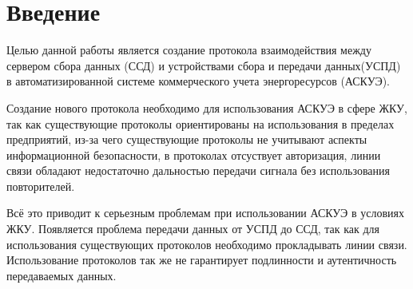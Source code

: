 \newpage
\section{Введение}
\setcounter{figure}{0}


Целью данной работы является создание протокола взаимодействия между сервером сбора данных (ССД) и устройствами сбора и передачи данных(УСПД) в автоматизированной системе коммерческого учета энергоресурсов (АСКУЭ).

Создание нового протокола необходимо для использования АСКУЭ в сфере ЖКУ, так как существующие протоколы ориентированы на использования в пределах предприятий, из-за чего существующие протоколы не учитывают аспекты информационной безопасности, в протоколах отсуствует авторизация, линии связи обладают недостаточно дальностью передачи сигнала без использования повторителей. 

Всё это приводит к серьезным проблемам при использовании АСКУЭ в условиях ЖКУ. Появляется проблема передачи данных от УСПД до ССД, так как для использования существующих протоколов необходимо прокладывать линии связи. Использование протоколов так же не гарантирует подлинности и аутентичность передаваемых данных. 

